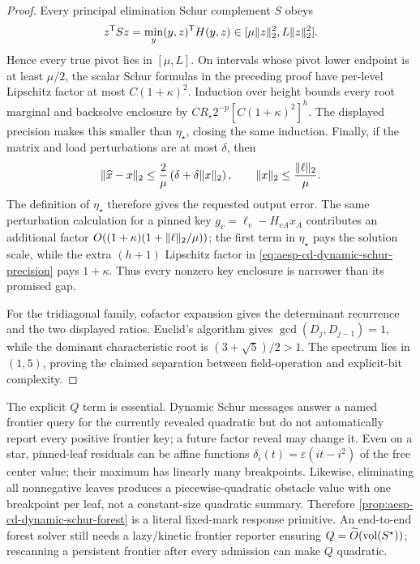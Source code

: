 \begin{proof}
Every principal elimination Schur complement $S$ obeys
\begin{equation*}
 z^{\mathsf T}Sz
 =\min_y (y,z)^{\mathsf T}H(y,z)
 \in[\mu\lVert z\rVert_2^2,L\lVert z\rVert_2^2].
\end{equation*}
Hence every true pivot lies in $[\mu,L]$.  On intervals whose pivot lower
endpoint is at least $\mu/2$, the scalar Schur formulas in the preceding
proof have per-level Lipschitz factor at most
$C(1+\kappa)^2$.  Induction over height bounds every root marginal and
backsolve enclosure by
$CR_\star2^{-p}[C(1+\kappa)^2]^h$.  The displayed precision makes this
smaller than $\eta_\star$, closing the same induction.  Finally, if the
matrix and load perturbations are at most $\delta$, then
\begin{equation*}
 \lVert\widehat x-x\rVert_2
 \leq\frac2\mu\left(\delta+\delta\lVert x\rVert_2\right),
 \qquad \lVert x\rVert_2\leq\frac{\lVert\ell\rVert_2}{\mu}.
\end{equation*}
The definition of $\eta_\star$ therefore gives the requested output error.
The same perturbation calculation for a pinned key
$g_v=\ell_v-H_{vA}x_A$ contributes an additional factor
$O((1+\kappa)(1+\lVert\ell\rVert_2/\mu))$; the first term in $\eta_\star$ pays the
solution scale, while the extra $(h+1)$ Lipschitz factor in
\cref{eq:aesp-cd-dynamic-schur-precision} pays $1+\kappa$.  Thus every
nonzero key enclosure is narrower than its promised gap.

For the tridiagonal family, cofactor expansion gives the determinant
recurrence and the two displayed ratios.  Euclid's algorithm gives
$\gcd(D_j,D_{j-1})=1$, while the dominant characteristic root is
$(3+\sqrt5)/2>1$.  The spectrum lies in $(1,5)$, proving the claimed
separation between field-operation and explicit-bit complexity.
\end{proof}

The explicit $Q$ term is essential.  Dynamic Schur messages answer a named
frontier query for the currently revealed quadratic but do not automatically
report every positive frontier key; a future factor reveal may change it.
Even on a star, pinned-leaf residuals can be affine functions
$\delta_i(t)=\varepsilon(it-i^2)$ of the free center value; their maximum has
linearly many breakpoints.  Likewise, eliminating all nonnegative leaves
produces a piecewise-quadratic obstacle value with one breakpoint per leaf,
not a constant-size quadratic summary.  Therefore
\cref{prop:aesp-cd-dynamic-schur-forest} is a literal fixed-mark response
primitive.  An end-to-end forest solver still needs a lazy/kinetic frontier
reporter ensuring $Q=\widetilde O(\operatorname{vol}(S^\star))$; rescanning a persistent
frontier after every admission can make $Q$ quadratic.
